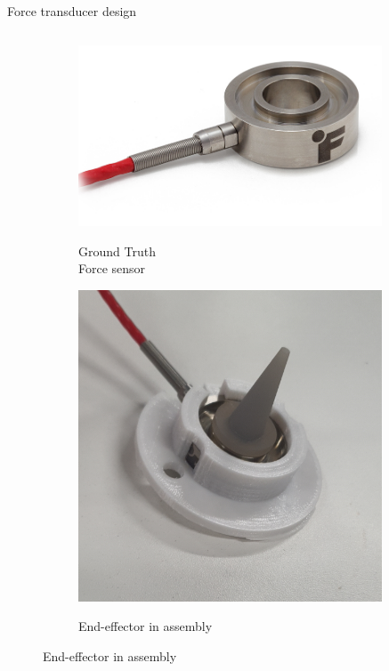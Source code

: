 \documentclass[aspectratio=169,xcolor=table]{beamer}
\begin{document}
\begin{frame}[t]{Force transducer design}
\begin{columns}[T,onlytextwidth]
\begin{column}{0.39\textwidth}
            \begin{figure}[H]
                \begin{subfigure}[t]{0.6\textwidth}
                    \centering\includegraphics[width=0.99\textwidth]{LTH350-DONUT-LOAD-CELL-1.png}\\
                    \caption*{\normalsize Ground Truth \\ Force sensor}
                    \label{fig:futek}
                \end{subfigure}
                \vspace{-0.2cm}

                \begin{subfigure}[t]{0.6\textwidth}
                    \centering\includegraphics[width=0.99\textwidth]{point_load.JPG}\\
                    \caption*{\normalsize End-effector in assembly}
                    \label{fig:point_load}
                \end{subfigure}
            \end{figure}


\end{column}
\end{columns}
\end{frame}
\end{document}
